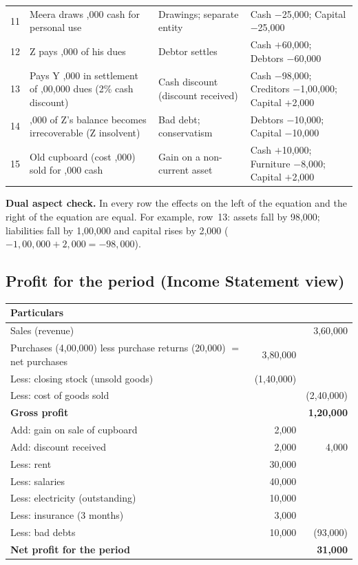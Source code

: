 \documentclass[11pt,a4paper]{article}
\newcommand{\Rs}{\ifmmode\text{\rsfont ₹}\else{\rsfont ₹}\fi}
\begin{document}
\begin{center}
\begin{tabularx}{\textwidth}{@{}r Y Y Y@{}}
11 & Meera draws \Rs 25,000 cash for personal use & Drawings; separate entity & Cash $-$25,000; Capital $-$25,000\\
12 & Z pays \Rs 60,000 of his dues & Debtor settles & Cash $+$60,000; Debtors $-$60,000\\
13 & Pays Y \Rs 98,000 in settlement of \Rs 1,00,000 dues (2\% cash discount) & Cash discount (discount received) & Cash $-$98,000; Creditors $-$1,00,000; Capital $+$2,000\\
14 & \Rs 10,000 of Z's balance becomes irrecoverable (Z insolvent) & Bad debt; conservatism & Debtors $-$10,000; Capital $-$10,000\\
15 & Old cupboard (cost \Rs 8,000) sold for \Rs 10,000 cash & Gain on a non-current asset & Cash $+$10,000; Furniture $-$8,000; Capital $+$2,000\\
\bottomrule
\end{tabularx}
\end{center}

\textbf{Dual aspect check.} In every row the effects on the left of the equation and the right of the equation are
equal. For example, row~13: assets fall by 98,000; liabilities fall by 1,00,000 and capital rises by 2,000
($-1{,}00{,}000+2{,}000=-98{,}000$).

\subsection{Profit for the period (Income Statement view)}

\begin{center}
\small
\begin{tabular}{@{}l r r@{}}
\toprule
\rowcolor{acteal!15}\textbf{Particulars} & \textbf{\Rs} & \textbf{\Rs}\\
\midrule
Sales (revenue) & & 3,60,000\\
\quad Purchases (4,00,000) less purchase returns (20,000) $=$ net purchases & 3,80,000 & \\
\quad Less: closing stock (unsold goods) & (1,40,000) & \\
Less: cost of goods sold & & (2,40,000)\\
\textbf{Gross profit} & & \textbf{1,20,000}\\
Add: gain on sale of cupboard & 2,000 & \\
Add: discount received & 2,000 & 4,000\\
Less: rent & 30,000 & \\
Less: salaries & 40,000 & \\
Less: electricity (outstanding) & 10,000 & \\
Less: insurance (3 months) & 3,000 & \\
Less: bad debts & 10,000 & (93,000)\\
\midrule
\textbf{Net profit for the period} & & \textbf{31,000}\\
\bottomrule
\end{tabular}
\end{center}
\end{document}
